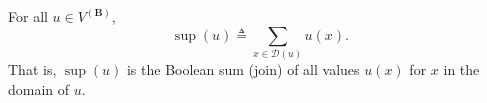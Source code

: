 For all $u \in V^{(\mathbf{B})}$,
$$\sup(u) \triangleq \sum_{x \in \mathcal{D}(u)} u(x).$$
That is, $\sup(u)$ is the Boolean sum (join) of all values $u(x)$ for $x$ in the domain of $u$.
